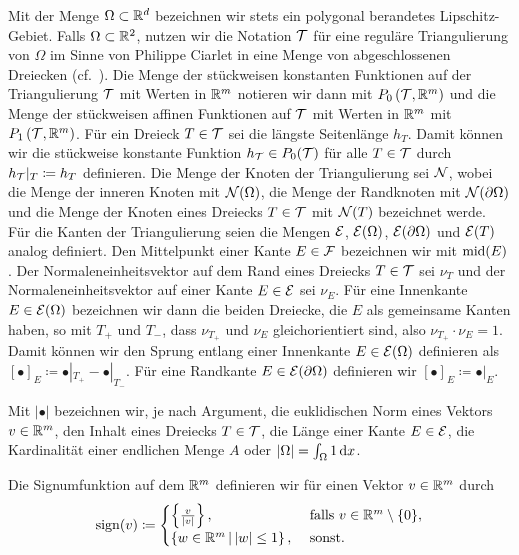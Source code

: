 Mit der Menge $\Omega\subset\mathbb{R}^d$ bezeichnen wir stets ein polygonal
berandetes Lipschitz-Gebiet. 
Falls $\Omega\subset\mathbb{R}^2$, nutzen wir die Notation $\mathcal{T}$ für eine reguläre
Triangulierung von $\Omega$ im Sinne von Philippe Ciarlet in eine Menge von
abgeschlossenen Dreiecken (cf.\ \cite[Kapitel 1.3.1]{Car09b}).
Die Menge der stückweisen konstanten Funktionen auf der Triangulierung $\mathcal{T}$
mit Werten in $\mathbb{R}^m$ notieren wir dann mit $ P_0\left(\mathcal{T},\mathbb{R}^m\right)$
und die Menge der stückweisen affinen Funktionen auf $\mathcal{T}$ mit Werten in
$\mathbb{R}^m$ mit $ P_1\left(\mathcal{T},\mathbb{R}^m\right)$.
Für ein Dreieck $T\in\mathcal{T}$ sei die längste Seitenlänge $h_T$.
Damit können wir die stückweise konstante Funktion $h_{\mathcal{T}}\in P_0(\mathcal{T})$
für alle $T\in\mathcal{T}$ durch $h_{\mathcal{T}}|_T\coloneqq h_T$ definieren.
Die Menge der Knoten der Triangulierung sei $\mathcal{N}$, wobei die Menge der
inneren Knoten mit $\mathcal{N}(\Omega)$, die Menge der Randknoten mit
$\mathcal{N}(\partial\Omega)$ und die Menge der Knoten eines Dreiecks $T\in\mathcal{T}$ mit
$\mathcal{N}(T)$ bezeichnet werde. 
Für die Kanten der Triangulierung seien die Mengen $\mathcal{E}$, $\mathcal{E}(\Omega)$,
$\mathcal{E}(\partial\Omega)$ und $\mathcal{E}(T)$ analog definiert. 
Den Mittelpunkt einer Kante $E\in\mathcal{F}$ bezeichnen wir mit $\textup{mid}(E)$.
Der Normaleneinheitsvektor auf dem Rand eines Dreiecks $T\in\mathcal{T}$ sei
$\nu_T$ und der Normaleneinheitsvektor auf einer Kante $E\in\mathcal{E}$ sei
$\nu_E$. 
Für eine Innenkante $E\in\mathcal{E}(\Omega)$ bezeichnen wir dann die beiden
Dreiecke, die $E$ als gemeinsame Kanten haben, so mit $T_+$ und $T_-$, dass
$\nu_{T_+}$ und $\nu_E$ gleichorientiert sind, also $\nu_{T_+}\cdot\nu_E=1$.
Damit können wir den Sprung entlang einer Innenkante $E\in\mathcal{E}(\Omega)$
definieren als $[\bullet]_E\coloneqq \bullet|_{T_+} -\bullet|_{T_-}$.
Für eine Randkante $E\in\mathcal{E}(\partial\Omega)$ definieren wir
$[\bullet]_E\coloneqq \bullet|_E$.

Mit $|\bullet|$ bezeichnen wir, je nach Argument, die euklidischen Norm eines
Vektors $v\in\mathbb{R}^m$, den Inhalt eines Dreiecks $T\in\mathcal{T}$, die Länge
einer Kante $E\in\mathcal{E}$, die Kardinalität einer endlichen Menge $A$
oder $|\Omega|=\int_\Omega 1\,\mathrm{d}x$.

Die Signumfunktion auf dem $\mathbb{R}^m$ definieren wir für einen Vektor
$v\in\mathbb{R}^m$ durch
\begin{align*}
  \operatorname{sign}(v)\coloneqq
  \begin{cases}
    \left\{\frac{v}{|v|}\right\},&\text{ falls }v\in\mathbb{R}^m\setminus\{0\},\\
    \left\{w\in\mathbb{R}^m\,\middle|\,|w|\leq 1\right\},&\text{ sonst.}
  \end{cases}
\end{align*}

